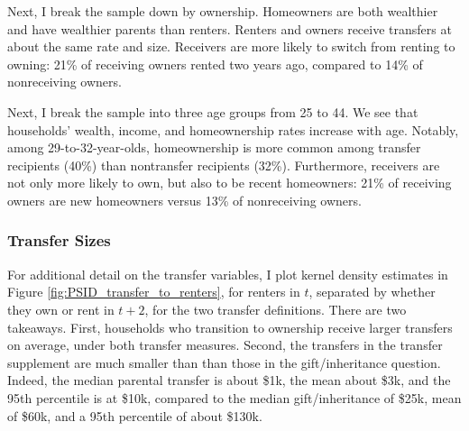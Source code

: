 \documentclass[12pt]{article}
\begin{document}
Next, I break the sample down by ownership. Homeowners are both wealthier and have wealthier parents than renters. Renters and owners receive transfers at about the same rate and size. Receivers are more likely to switch from renting to owning: 21\% of receiving owners rented two years ago, compared to 14\% of nonreceiving owners.

Next, I break the sample into three age groups from 25 to 44. We see that households' wealth, income, and homeownership rates increase with age. Notably, among 29-to-32-year-olds, homeownership is more common among transfer recipients (40\%) than nontransfer recipients (32\%). Furthermore, receivers are not only more likely to own, but also to be recent homeowners: 21\% of receiving owners are new homeowners versus 13\% of nonreceiving owners. 

\subsubsection{Transfer Sizes}
For additional detail on the transfer variables, I plot kernel density estimates in Figure \ref{fig:PSID_transfer_to_renters}, for renters in $t$, separated by whether they own or rent in $t+2$, for the two transfer definitions. There are two takeaways. First, households who transition to ownership receive larger transfers on average, under both transfer measures. Second, the transfers in the transfer supplement are much smaller than than those in the gift/inheritance question. Indeed, the median parental transfer is about \$1k, the mean about \$3k, and the 95th percentile is at \$10k, compared to the median gift/inheritance of \$25k, mean of \$60k, and a 95th percentile of about \$130k.
\end{document}
